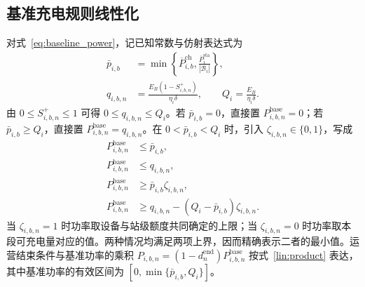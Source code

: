 \subsection{基准充电规则线性化}
\label{lin:baseline_charging_section}
对式~\eqref{eq:baseline_power}，记已知常数与仿射表达式为
\begin{equation}
\begin{aligned}
\bar p_{i,b}
&=\min\left\{\overline P_{i,b}^{\mathrm{ch}},
\frac{\overline P_i^{\mathrm{sta}}}{|\mathcal B_i|}\right\},\\
q_{i,b,n}&=\frac{E_B(1-S_{i,b,n}^{+})}{\eta_i\delta},
\qquad Q_i=\frac{E_B}{\eta_i\delta}.
\end{aligned}
\label{lin:baseline_bounds}
\end{equation}
由 $0\le S_{i,b,n}^{+}\le1$ 可得 $0\le q_{i,b,n}\le Q_i$。若 $\bar p_{i,b}=0$，直接置 $P_{i,b,n}^{\mathrm{base}}=0$；若 $\bar p_{i,b}\ge Q_i$，直接置 $P_{i,b,n}^{\mathrm{base}}=q_{i,b,n}$。在 $0<\bar p_{i,b}<Q_i$ 时，引入 $\zeta_{i,b,n}\in\{0,1\}$，写成
\begin{equation}
\begin{aligned}
P_{i,b,n}^{\mathrm{base}}&\le\bar p_{i,b},\\
P_{i,b,n}^{\mathrm{base}}&\le q_{i,b,n},\\
P_{i,b,n}^{\mathrm{base}}&\ge\bar p_{i,b}\zeta_{i,b,n},\\
P_{i,b,n}^{\mathrm{base}}&\ge q_{i,b,n}-(Q_i-\bar p_{i,b})\zeta_{i,b,n}.
\end{aligned}
\label{lin:baseline_min}
\end{equation}
当 $\zeta_{i,b,n}=1$ 时功率取设备与站级额度共同确定的上限；当 $\zeta_{i,b,n}=0$ 时功率取本段可充电量对应的值。两种情况均满足两项上界，因而精确表示二者的最小值。运营结束条件与基准功率的乘积 $P_{i,b,n}=(1-d_n^{\mathrm{end}})P_{i,b,n}^{\mathrm{base}}$ 按式~\eqref{lin:product} 表达，其中基准功率的有效区间为 $[0,\min\{\bar p_{i,b},Q_i\}]$。
